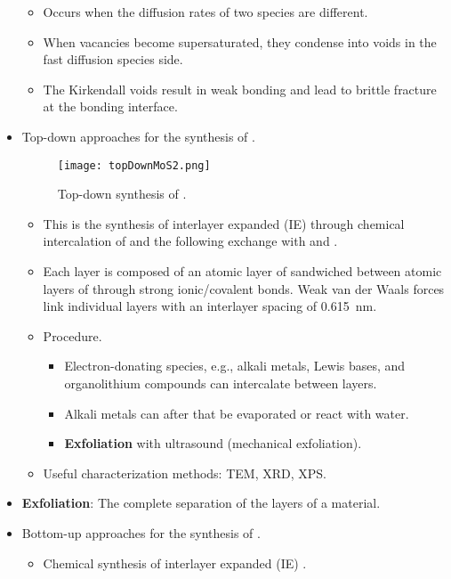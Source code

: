 \documentclass[../notes.tex]{subfiles}
\begin{document}
\begin{itemize}
    \begin{itemize}
        \item Occurs when the diffusion rates of two species are different.
        \item When vacancies become supersaturated, they condense into voids in the fast diffusion species side.
        \item The Kirkendall voids result in weak bonding and lead to brittle fracture at the bonding interface.
    \end{itemize}
    \item Top-down approaches for the synthesis of .
    \begin{figure}[h!]
        \centering
        \texttt{[image: topDownMoS2.png]}
        \caption{Top-down synthesis of .}
        \label{fig:topDownMoS2}
    \end{figure}
    \begin{itemize}
        \item This is the synthesis of interlayer expanded (IE)  through chemical intercalation of  and the following exchange with  and .
        \item Each  layer is composed of an atomic layer of  sandwiched between atomic layers of  through strong ionic/covalent bonds. Weak van der Waals forces link individual  layers with an interlayer spacing of \SI{0.615}{\nano\meter}.
        \item Procedure.
        \begin{itemize}
            \item Electron-donating species, e.g., alkali metals, Lewis bases, and organolithium compounds can intercalate between layers.
            \item Alkali metals can after that be evaporated or react with water.
            \item \textbf{Exfoliation} with ultrasound (mechanical exfoliation).
        \end{itemize}
        \item Useful characterization methods: TEM, XRD, XPS.
    \end{itemize}
    \item \textbf{Exfoliation}: The complete separation of the layers of a material.
    \item Bottom-up approaches for the synthesis of .
    \begin{itemize}
        \item Chemical synthesis of interlayer expanded (IE) .

\end{itemize}
\end{itemize}
\end{document}
